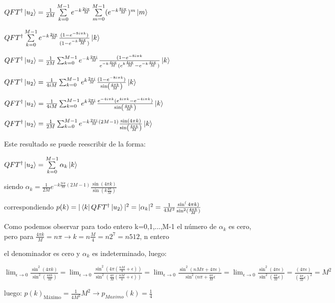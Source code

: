 \documentclass[11pt, spanish]{report}
\begin{document}
$QFT^\dagger \ket{u_2} = \frac{1}{2M} \sum\limits_{k=0}^{M-1} e^{-k \frac{2 i \pi}{M}} \sum\limits_{m=0}^{M-1} (e^{-k \frac{8 i \pi}{M}})^m \ket{m}$

$QFT^\dagger \sum\limits_{k=0}^{M-1} e^{-k \frac{2 i \pi}{M}} \frac{(1-e^{-8 i \pi k})}{(1 - e^{-k \frac{8 i \pi}{M}})} \ket{k}$

$QFT^\dagger \ket{u_2} = \frac{1}{2M} \sum_{k=0}^{M-1} e^{-k \frac{2 \pi i}{M}} \frac{(1 - e^{-8 i \pi k}}{e^{-k \frac{4 i \pi}{M}} (e^{k \frac{4 i \pi}{M}} - e^{-k \frac{4 i \pi}{M}})} \ket{k}$

$QFT^\dagger \ket{u_2} = \frac{1}{4 i M} \sum_{k=0}^{M-1} e^{k \frac{2 \pi i}{M}} \frac{(1 - e^{-8 i \pi k})}{\sin(\frac{4\pi k}{M})} \ket{k}$

$QFT^\dagger \ket{u_2} = \frac{1}{4 i M} \sum_{k=0}^{M-1} e^{k \frac{2 \pi i}{M}} \frac{e^{-4 i \pi k} (e^{4 i \pi k} - e^{-4 i \pi k})}{\sin(\frac{4\pi k}{M})} \ket{k}$

$QFT^\dagger \ket{u_2} = \frac{1}{2M} \sum_{k=0}^{M-1} e^{-k \frac{2 \pi i}{M} (2M-1)} \frac{\sin(4\pi k)}{\sin(\frac{4\pi k}{M})} \ket{k}$

Este resultado se puede reescribir de la forma:

$QFT^\dagger \ket{u_2} = \sum\limits_{k=0}^{M-1} \alpha_k \ket{k}$

siendo $\alpha_k = \frac{1}{2M} e^{-k \frac{2 i \pi}{M} (2M-1)} \frac{\sin(4 \pi k)}{\sin(k \frac{4 \pi}{M})}$

correspondiendo $p(k) = |\bra{k} QFT^\dagger \ket{u_2}|^2 = |\alpha_k|^2 = \frac{1}{4M^2} \frac{\sin^(4\pi k)}{\sin^2(\frac{4 \pi k}{M})}$

Como podemos observar para todo entero k=0,1,...,M-1 el número de $\alpha_k$ es cero, pero para $\frac{4 \pi k}{M} = n \pi \rightarrow k = n \frac{M}{4} = n 2^7 = n 512$, n entero

el denominador es cero y $\alpha_k$ es indeterminado, luego:

$\lim_{\epsilon \to 0} \frac{\sin^2(4 \pi k)}{\sin^2(\frac{4\pi k}{M})} = \lim_{\epsilon \to 0} \frac{\sin^2(4 \pi (\frac{n M}{4} + \epsilon))}{\sin^2(\frac{4\pi}{M} (\frac{n M}{4} + \epsilon))} = \lim_{\epsilon \to 0} \frac{\sin^2(n M \pi + 4 \pi \epsilon)}{\sin^2(n \pi + \frac{4\pi}{M} \epsilon} = \lim_{\epsilon \to 0} \frac{\sin^2(4 \pi \epsilon)}{\sin^2(\frac{4 \pi}{M} \epsilon)} = \frac{(4 \pi \epsilon)}{(\frac{4 \pi}{M} \epsilon)^2} = M^2$

luego: $p(k)_{\text{Máximo}} = \frac{1}{4M^2} M^2 \rightarrow p_{Maximo}(k) = \frac{1}{4}$
\end{document}
